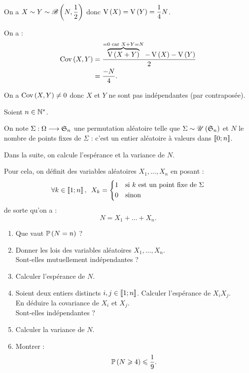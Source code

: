 \begin{corr}[1a]~\\
On a \(X\sim Y\sim \loibinomiale{N}{\dfrac{1}{2}}\) donc \(\vari{X}=\vari{Y}=\dfrac{1}{4}N\).

On a : \[\begin{aligned}
\cov{X}{Y}&=\dfrac{\overbrace{\vari{X+Y}}^{=0\text{ car }X+Y=N}-\vari{X}-\vari{Y}}{2} \\
&=\dfrac{-N}{4}.
\end{aligned}\]
\end{corr}

\begin{corr}[1b]
On a \(\cov{X}{Y}\not=0\) donc \(X\) et \(Y\) ne sont pas indépendantes (par contraposée).
\end{corr}

\begin{exo}[Exercice 12]
Soient \(n\in\Ns\).

On note \(\Sigma:\Omega\to\S{n}\) une permutation aléatoire telle que \(\Sigma\sim\loiuniforme{\S{n}}\) et \(N\) le nombre de points fixes de \(\Sigma\) : c'est un entier aléatoire à valeurs dans \(\interventierii{0}{n}\).

Dans la suite, on calcule l'espérance et la variance de \(N\).

Pour cela, on définit des variables aléatoires \(X_1,\dots,X_n\) en posant : \[\quantifs{\forall k\in\interventierii{1}{n}}X_k=\begin{dcases}
1 &\text{si }k\text{ est un point fixe de }\Sigma \\
0 &\text{sinon}
\end{dcases}\] de sorte qu'on a : \[N=X_1+\dots+X_n.\]

\begin{enumerate}
    \item Que vaut \(\proba{N=n}\) ? \\
    \item Donner les lois des variables aléatoires \(X_1,\dots,X_n\). \\ Sont-elles mutuellement indépendantes ? \\
    \item Calculer l'espérance de \(N\). \\
    \item Soient deux entiers distincts \(i,j\in\interventierii{1}{n}\). Calculer l'espérance de \(X_iX_j\). \\ En déduire la covariance de \(X_i\) et \(X_j\). \\ Sont-elles indépendantes ? \\
    \item Calculer la variance de \(N\). \\
    \item Montrer : \[\proba{N\geq4}\leq\dfrac{1}{9}.\]
\end{enumerate}
\end{exo}

